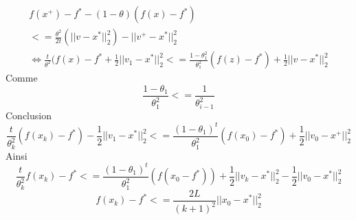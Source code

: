 \documentclass{article}
\begin{document}
\begin{equation}
\begin{split}
f(x^+)-f^*-(1-\theta)(f(x)-f^*)\\
<=\frac{\theta^2}{2t}(||v-x^*||_2^2)-||v^+-x^*||_2^2\\
\Leftrightarrow \frac{t}{\theta^2}(f(x)-f^*+\frac{1}{2}||v_1-x^*||_2^2<=\frac{1-\theta_1^2}{\theta_1^2}(f(z)-f^*)+\frac{1}{2}||v-x^*||_2^2
\end{split}
\end{equation}
Comme 
\begin{equation}
\frac{1-\theta_1}{\theta_1^2}<=\frac{1}{\theta_{i-1}^2}
\end{equation}
Conclusion
\begin{equation}
\frac{t}{\theta_k^2}(f(x_k)-f^*)-\frac{1}{2}||v_1-x^*||_2^2<=\frac{(1-\theta_1)^t}{\theta_1^2}(f(x_0)-f^*)+\frac{1}{2}||v_0-x^+||_2^2
\end{equation}
Ainsi
\begin{equation}
\frac{t}{\theta_k^2}f(x_k)-f^*<=\frac{(1-\theta_1)^t}{\theta_1^2}(f(x_0-f^*))+\frac{1}{2}||v_k-x^*||_2^2-\frac{1}{2}||v_0-x^*||_2^2
\end{equation}
\begin{equation}
f(x_k)-f^*<=\frac{2L}{(k+1)^2}||x_0-x^*||_2^2
\end{equation}
\end{document}
